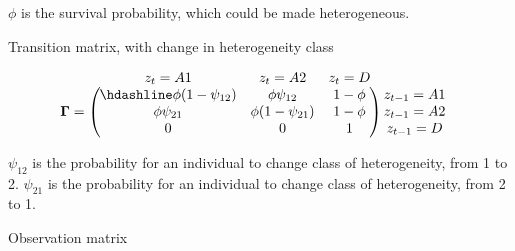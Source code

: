 \documentclass[
  12pt,
]{krantz}
\begin{document}
\(\phi\) is the survival probability, which could be made heterogeneous.

Transition matrix, with change in heterogeneity class

\[
  \begin{matrix}
& \\
\mathbf{\Gamma} =
  \left ( \vphantom{ \begin{matrix} 12 \\ 12 \\ 12 \end{matrix} } \right .
          \end{matrix}
          \hspace{-1.2em}
          \begin{matrix}
          z_t=A1 & z_t=A2 & z_t=D \\ \hdashline
          \phi (1-\psi_{12}) & \phi \psi_{12} & 1 - \phi\\
          \phi \psi_{21} & \phi (1-\psi_{21}) & 1 - \phi\\
          0 & 0 & 1
          \end{matrix}
          \hspace{-0.2em}
          \begin{matrix}
          & \\
          \left . \vphantom{ \begin{matrix} 12 \\ 12 \\ 12 \end{matrix} } \right )
\begin{matrix}
z_{t-1}=A1 \\ z_{t-1}=A2 \\ z_{t-1}=D
\end{matrix}
\end{matrix}
\]

\(\psi_{12}\) is the probability for an individual to change class of heterogeneity, from 1 to 2. \(\psi_{21}\) is the probability for an individual to change class of heterogeneity, from 2 to 1.

Observation matrix
\end{document}
